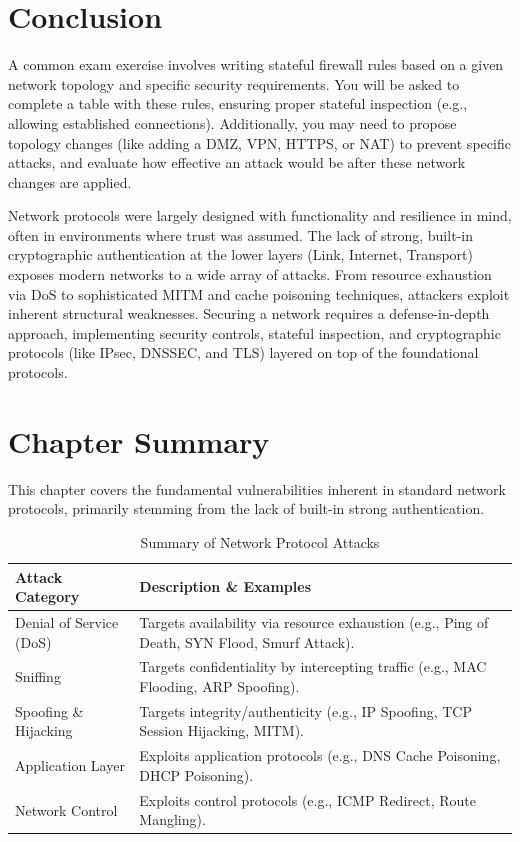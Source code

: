 \section{Conclusion}

\begin{tcolorbox}[colback=blue!5!white,colframe=blue!75!black,title=Exam Insight]
A common exam exercise involves writing stateful firewall rules based on a given network topology and specific security requirements. You will be asked to complete a table with these rules, ensuring proper stateful inspection (e.g., allowing established connections). Additionally, you may need to propose topology changes (like adding a DMZ, VPN, HTTPS, or NAT) to prevent specific attacks, and evaluate how effective an attack would be after these network changes are applied.
\end{tcolorbox}

Network protocols were largely designed with functionality and resilience in mind, often in environments where trust was assumed. The lack of strong, built-in cryptographic authentication at the lower layers (Link, Internet, Transport) exposes modern networks to a wide array of attacks. From resource exhaustion via DoS to sophisticated MITM and cache poisoning techniques, attackers exploit inherent structural weaknesses. Securing a network requires a defense-in-depth approach, implementing security controls, stateful inspection, and cryptographic protocols (like IPsec, DNSSEC, and TLS) layered on top of the foundational protocols.

\section*{Chapter Summary}

This chapter covers the fundamental vulnerabilities inherent in standard network protocols, primarily stemming from the lack of built-in strong authentication.

\begin{table}[ht]
\centering
\begin{tabular}{|l|p{10cm}|}
\hline
\textbf{Attack Category} & \textbf{Description \& Examples} \\
\hline
Denial of Service (DoS) & Targets availability via resource exhaustion (e.g., Ping of Death, SYN Flood, Smurf Attack). \\
Sniffing & Targets confidentiality by intercepting traffic (e.g., MAC Flooding, ARP Spoofing). \\
Spoofing \& Hijacking & Targets integrity/authenticity (e.g., IP Spoofing, TCP Session Hijacking, MITM). \\
Application Layer & Exploits application protocols (e.g., DNS Cache Poisoning, DHCP Poisoning). \\
Network Control & Exploits control protocols (e.g., ICMP Redirect, Route Mangling). \\
\hline
\end{tabular}
\caption{Summary of Network Protocol Attacks}
\end{table}
